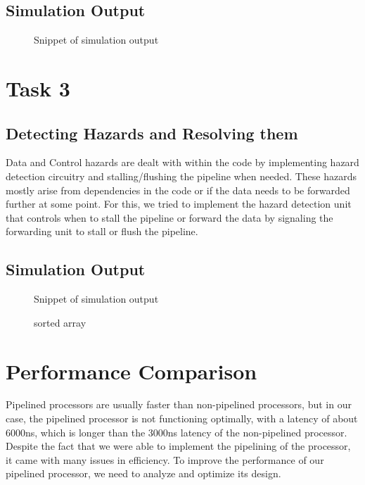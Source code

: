 \documentclass[12pt]{article}
\begin{document}
\subsection{Simulation Output}\label{code2}
    \begin{figure}[htbp!]
        \centering
        \caption{Snippet of simulation output}
    \end{figure}

\section{Task 3}\label{task3}
\subsection{Detecting Hazards and Resolving them}\label{hazards}
   Data and Control hazards are dealt with within the code by implementing hazard detection circuitry and stalling/flushing the pipeline when needed. These hazards mostly arise from dependencies in the code or if the data needs to be forwarded further at some point. For this, we tried to implement the hazard detection unit that controls when to stall the pipeline or forward the data by signaling the forwarding unit to stall or flush the pipeline.

\newpage
\subsection{Simulation Output}\label{code3}

    \begin{figure}[htbp!]
        \centering
        \caption{Snippet of simulation output}
    \end{figure}
    \begin{figure}[htbp!]
        \centering
        \caption{sorted array}
    \end{figure}

\section{Performance Comparison}\label{performance}
    Pipelined processors are usually faster than non-pipelined processors, but in our case, the pipelined processor is not functioning optimally, with a latency of about 6000ns, which is longer than the 3000ns latency of the non-pipelined processor. Despite the fact that we were able to implement the pipelining of the processor, it came with many issues in efficiency. To improve the performance of our pipelined processor, we need to analyze and optimize its design.
\end{document}
